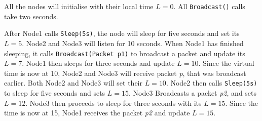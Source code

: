 
All the nodes will initialise with their local time $L = 0$. All \texttt{Broadcast()} calls take two seconds.\smallbreak

After Node1 calls \texttt{Sleep(5s)}, the node will sleep for five seconds and set its $L = 5$. Node2 and Node3 will listen for 10 seconds. When Node1 has finished sleeping, it calls \texttt{Broadcast(Packet p1)} to broadcast a packet and update its $L = 7$. Node1 then sleeps for three seconds and update $L = 10$. Since the virtual time is now at 10, Node2 and Node3 will receive packet \textit{p}, that was broadcast earlier. Both Node2 and Node3 will set their $L = 10$. Node2 then calls \texttt{Sleep(5s)} to sleep for five seconds and sets $L = 15$. Node3 Broadcasts a packet \textit{p2}, and sets $L = 12$. Node3 then proceeds to sleep for three seconds with its $L = 15$. Since the time is now at 15, Node1 receives the packet \textit{p2} and update $L = 15$.



